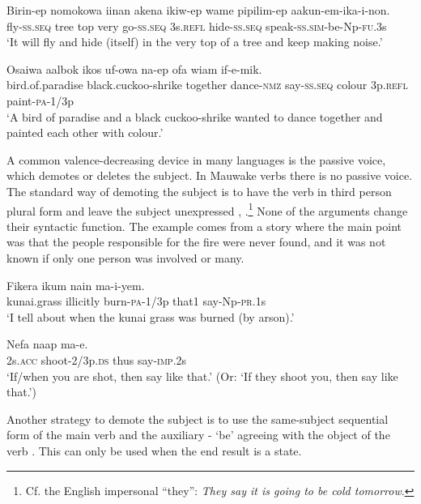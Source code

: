 \ea%
\label{ex:3:x1834}
\gll Birin-ep nomokowa iinan akena ikiw-ep wame pipilim-ep aakun-em-ika-i-non.\\
fly-\textsc{ss}.\textsc{seq} tree top very go-\textsc{ss}.\textsc{seq} 3s.\textsc{refl} hide-\textsc{ss}.\textsc{seq} speak-\textsc{ss}.\textsc{sim}-be-Np-\textsc{fu}.3s\\
\glt`It will fly and hide (itself) in the very top of a tree and keep making noise.'
\z

\ea%
\label{ex:3:x1835}
\gll Osaiwa aalbok ikos uf-owa na-ep ofa wiam if-e-mik.\\
bird.of.paradise black.cuckoo-shrike together dance-\textsc{nmz} say-\textsc{ss}.\textsc{seq} colour 3p.\textsc{refl} paint-\textsc{pa}-1/3p\\
\glt`A bird of paradise and a black cuckoo-shrike wanted to dance together and painted each other with colour.'
\z

A common valence-decreasing device in many languages is the passive voice, which demotes or deletes the subject. In Mauwake verbs there is no passive voice. The standard way of demoting the subject is to have the verb in third person plural form and leave the subject  unexpressed ,  .\footnote{Cf. the English impersonal ``they'': \textit{They say it is going to be cold tomorrow}.} None of the arguments change their syntactic function. The example  comes from a story where the main point was that the people responsible for the fire were never found, and it was not known if only one person was involved or many. 

\ea%
\label{ex:3:x1009}
\gll Fikera ikum  nain ma-i-yem. \\
kunai.grass illicitly burn-\textsc{pa}-1/3p that1 say-Np-\textsc{pr}.1s\\
\glt`I tell about when the kunai grass was burned (by arson).'
\z

\ea%
\label{ex:3:x1010}
\gll Nefa  naap ma-e. \\
2s.\textsc{acc} shoot-2/3p.\textsc{ds} thus say-\textsc{imp}.2s\\
\glt`If/when you are shot, then say like that.' (Or: `If they shoot you, then say like that.')
\z

Another strategy to demote the subject is to use the same-subject sequential form of the main verb and the auxiliary - `be' agreeing with the object of the verb  . This can only be used when the end result is a state. 

